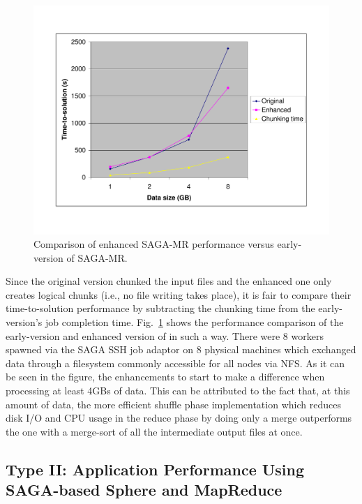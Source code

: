 \documentclass[3p,twocolumn]{elsarticle}
\begin{document}
\begin{figure}[htb!]
 \includegraphics[scale=0.3]{sagamr_original_vs_enhanced.pdf}
 \caption{Comparison of enhanced SAGA-MR performance versus
   early-version of SAGA-MR.}
 \label{sagamr_comparison}
\end{figure}

Since the original \sagamapreduce version chunked the input files and
the enhanced one only creates logical chunks (i.e., no file writing takes
place), it is fair to compare their time-to-solution performance by subtracting
the chunking time from the early-version's job completion time.
Fig.~\ref{sagamr_comparison} shows the performance comparison of the early-version and
enhanced version of \sagamapreduce in such a way.
There were 8 workers spawned via the SAGA SSH job adaptor on 8 physical
machines which exchanged data through a filesystem commonly accessible for all
nodes via NFS. As it can be seen in the figure, the enhancements to \sagamapreduce
start to make a difference when processing at least 4GBs of data.
This can be attributed to the fact that, at this amount of data, the
more efficient shuffle phase implementation which reduces disk I/O and CPU
usage in the reduce phase by doing only a merge outperforms the one with
a merge-sort of all the intermediate output files at once.

\subsection{Type II: Application Performance Using SAGA-based Sphere
  and MapReduce}
\end{document}
